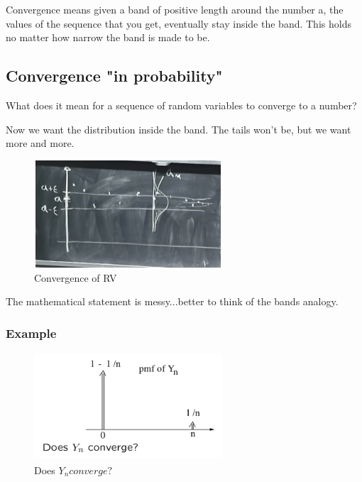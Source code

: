 Convergence means given a band of positive length around the number a, the values of the sequence that you get, eventually stay inside the band.  This holds no matter how narrow the band is made to be.

\subsection{Convergence "in probability"}


What does it mean for a sequence of random variables to converge to a number?

 Now we want the distribution inside the band.  The tails won't be, but we want more and more.

\begin{figure}[ht]
\centering
\includegraphics[width=7cm, height=4cm]{images/L19/IMG_3317.jpeg}
\caption{Convergence of RV}
\end{figure}

The mathematical statement is messy...better to think of the bands analogy.

\subsubsection*{Example}


\begin{figure}[ht]
\centering
\includegraphics[width=7cm, height=4cm]{images/L19/IMG_1572.jpeg}
\caption{Does $Y_n converge?$}
\end{figure}

